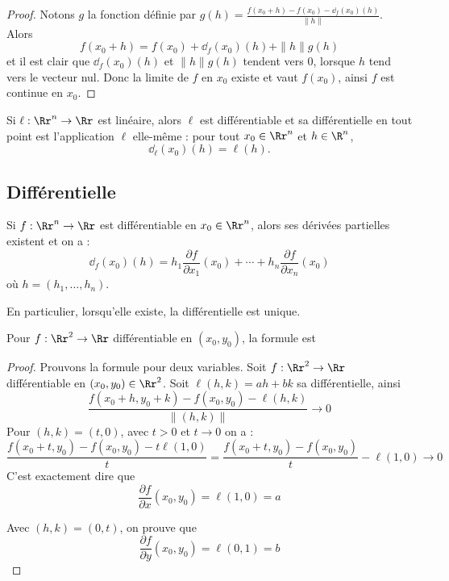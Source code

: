 \documentclass[12pt, class=report,crop=false]{standalone}
\begin{document}
{\begin{proof}
Notons $g$ la fonction définie par $g(h)=\frac{f(x_0+h) - f(x_0) - \dd_f(x_0)(h)}{\|h\|}$. Alors 
$$f(x_0 + h)=f(x_0) + \dd_f(x_0)(h) +\|h\|g(h)$$
et il est clair que $\dd_f(x_0)(h)$ et $\|h\|g(h)$ tendent vers $0$, lorsque $h$ tend vers le vecteur nul. Donc la limite de $f$ en $x_0$ existe et vaut $f(x_0)$, ainsi $f$ est continue en $x_0$.
\end{proof}

\begin{exemple}
Si $\ell : \Rr^n \to \Rr$ est linéaire, alors $\ell$ est différentiable et sa différentielle en tout point est l'application $\ell$ elle-même : pour tout $x_0 \in \Rr^n$ et $h \in \R^n$,
$$
\dd_\ell (x_0) (h) = \ell(h).
$$ 
\end{exemple}


\subsection{Différentielle}


\begin{proposition}
\label{prop:differ}
Si $f : \Rr^n \to \Rr$ est différentiable en $x_0 \in \Rr^n$, alors ses dérivées partielles existent et on a :
$$
\dd_f(x_0)(h) = 
h_1 \frac{\partial f}{\partial x_1}(x_0)  + \cdots + h_n \frac{\partial f}{\partial x_n}(x_0)  
$$
où $h = (h_1,\ldots,h_n)$.
\end{proposition}
En particulier, lorsqu'elle existe, la différentielle est unique.

\bigskip

Pour $f : \Rr^2 \to \Rr$ différentiable en $(x_0,y_0)$, la formule est

\begin{proof}
Prouvons la formule pour deux variables.
Soit $f : \Rr^2 \to \Rr$ différentiable en $(x_0,y_0) \in \Rr^2$.
Soit $\ell(h,k) = ah + bk$ sa différentielle, ainsi
$$\frac{f(x_0+ h,y_0+k) - f(x_0,y_0) - \ell(h,k)}{\|(h,k)\|} \longrightarrow 0$$
Pour $(h,k) = (t,0)$, avec $t>0$ et $t \to 0$ on a :
$$\frac{f(x_0+ t,y_0) - f(x_0,y_0) - t\ell(1,0)}{t}
= \frac{f(x_0+ t,y_0) - f(x_0,y_0)}{t} - \ell(1,0) \longrightarrow  0$$
C'est exactement dire que 
$$\frac{\partial f}{\partial x}(x_0,y_0) = \ell(1,0) = a$$

Avec $(h,k) = (0,t)$, on prouve que 
$$\frac{\partial f}{\partial y}(x_0,y_0) = \ell(0,1) = b$$


\end{proof}}
\end{document}
